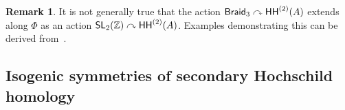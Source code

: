 \documentclass{amsart}
\theoremstyle{definition}
\newtheorem{remark}[theorem]{Remark}
\theoremstyle{remark}
\DeclareMathOperator{\Alg}{\sf Alg}
\newcommand{\lacts}{\curvearrowright}
\DeclareMathOperator{\fr}{\sf fr}
\DeclareMathOperator{\Braid}{{\sf Braid}_3}
\DeclareMathOperator{\SL}{\sf SL}
\DeclareMathOperator{\HHt}{{\sf HH}^{(2)}}
\begin{document}
\begin{remark}
It is not generally true that the action $\Braid \lacts \HHt(A)$ 
extends along $\Phi$ as an action $\SL_2(\ZZ) \lacts \HHt(A)$. 
Examples demonstrating this can be derived from~\cite{BZ.Jordan  INTEGRATING QUANTUM GROUPS OVER SURFACES}.

\end{remark}








































%













\subsection{Isogenic symmetries of secondary Hochschild homology}
\end{document}
